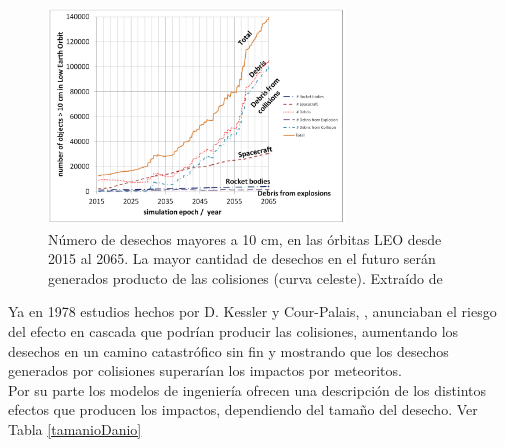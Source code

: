 \begin{figure}[!h]
  \centering
  \includegraphics[width=0.7\textwidth]{imagenes/debriscollision}
  \caption[N\'umero de Desechos en las \'orbitas LEO desde 2015 al 2065]{N\'umero de desechos mayores a 10 cm, en las \'orbitas LEO desde 2015 al 2065. La mayor cantidad de desechos en el futuro ser\'an generados producto de las colisiones (curva celeste). Extra\'ido de \citep{karacalioglu2016impact}}
  \label{fig:debriscollision}
\end{figure}

Ya en 1978  estudios hechos por D. Kessler y Cour-Palais,
 \citep{kessler0}, anunciaban el riesgo del efecto en cascada que podr\'ian producir las colisiones, aumentando los desechos en un camino catastr\'ofico sin fin y mostrando que los desechos generados por colisiones superar\'ian los impactos por meteoritos.\\
 
 Por su parte los modelos de ingenier\'ia ofrecen una descripci\'on de los distintos efectos que producen los impactos, dependiendo del tama\~no del desecho. Ver Tabla \ref{tamanioDanio}\\
 
